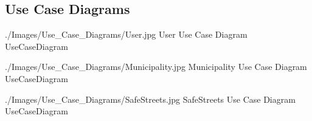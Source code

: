 \documentclass[../../../rasd.tex]{subfiles}
\begin{document}
\subsection{Use Case Diagrams\label{sect:3.2.2}}

\image {13cm} {./Images/Use_Case_Diagrams/User.jpg} {User Use Case Diagram} {UseCaseDiagram}

\image {13cm} {./Images/Use_Case_Diagrams/Municipality.jpg} {Municipality Use Case Diagram} {UseCaseDiagram}

\image {13cm} {./Images/Use_Case_Diagrams/SafeStreets.jpg} {SafeStreets Use Case Diagram} {UseCaseDiagram}

\newpage
\end{document}
